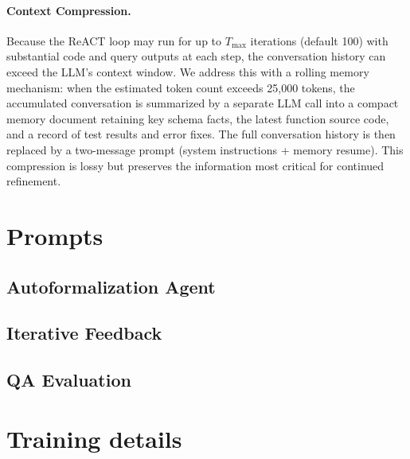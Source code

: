 \paragraph{Context Compression.}
Because the ReACT loop may run for up to $T_{\max}$ iterations (default 100) with substantial code and query outputs at each step, the conversation history can exceed the LLM's context window. We address this with a rolling memory mechanism: when the estimated token count exceeds 25{,}000 tokens, the accumulated conversation is summarized by a separate LLM call into a compact memory document retaining key schema facts, the latest function source code, and a record of test results and error fixes. The full conversation history is then replaced by a two-message prompt (system instructions + memory resume). This compression is lossy but preserves the information most critical for continued refinement.


\section{Prompts}
\label{app:prompts}

\subsection{Autoformalization Agent}



\subsection{Iterative Feedback}




\subsection{QA Evaluation}




\section{Training details}
\label{app:train_details}

